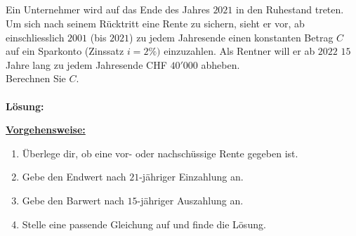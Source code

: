 \subsection*{}
Ein Unternehmer wird auf das Ende des Jahres $2021$ in den Ruhestand treten.
Um sich nach seinem Rücktritt eine Rente zu sichern, sieht er vor,
ab einschliesslich $2001$ (bis $2021$) zu jedem Jahresende einen
konstanten Betrag $C$ auf ein Sparkonto (Zinssatz $i = 2\%)$ einzuzahlen.
Als Rentner will er ab $2022$ $15$ Jahre lang zu jedem Jahresende
CHF $40'000$ abheben.\\
Berechnen Sie $C$.
\\
\\
\textbf{Lösung:}
\begin{mdframed}
\underline{\textbf{Vorgehensweise:}}
\begin{enumerate}
\item Überlege dir, ob eine vor- oder nachschüssige Rente gegeben ist.
\item Gebe den Endwert nach $21$-jähriger Einzahlung an.
\item Gebe den Barwert nach $15$-jähriger Auszahlung an.
\item Stelle eine passende Gleichung auf und finde die Lösung.
\end{enumerate}
\end{mdframed}

